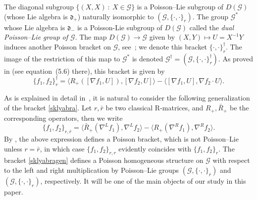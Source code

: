 \documentclass{amsart}
\theoremstyle{definition}
\theoremstyle{remark}
\numberwithin{equation}{section}
\numberwithin{theorem}{section}
\def\D{{\mathfrak d}}
\def\G{{\mathcal G}}
\def\Poi{{\{{\cdot},{\cdot}\}}}
\begin{document}
The diagonal subgroup $\{ (X,X)\ : \ X\in \G\}$ is a Poisson--Lie subgroup of $D(\G)$ (whose Lie algebra is $\D_+$) naturally isomorphic to $(\G,\Poi_r)$.
The group $\G^*$  whose Lie algebra is $\D_-$ is a Poisson-Lie subgroup of $D(\G)$ called the {\em dual Poisson--Lie group of $\G$}.
The map $D(\G) \to \G$ given by $(X,Y) \mapsto U=X^{-1} Y$ induces another Poisson bracket on $\G$, see~\cite{r-sts}; we denote this bracket $\Poi^\dag_r$. 
The image of the restriction of this map to $\G^*$ is denoted 
$\G^\dag=(\G,\Poi^\dag_r)$.
As proved in \cite[Lemma~5.5]{GSVdouble} 
(see equation~(5.6) there), this bracket is given by
\begin{equation}\label{dualbra}
\{f_1,f_2\}^{\dagger}_r =\langle R_+([\nabla f_1,U]),[\nabla f_2,U]\rangle-\langle[\nabla f_1,U],\nabla f_2{\cdot} U\rangle.
\end{equation}


 As is explained in detail in~\cite{GSVple, GSVuni},
 it is natural to consider the following generalization of the 
bracket \eqref{sklyabra}.
Let $r, \bar r$ be two classical R-matrices, and $R_+, \bar R_+$ be the corresponding operators, then we write
\begin{equation}\label{sklyabragen}
\{f_1,f_2\}_{r,\bar r} = \langle \bar R_+(\nabla^L f_1), \nabla^L f_2 \rangle -\langle R_+(\nabla^R f_1), \nabla^R f_2 \rangle.
\end{equation} 
By \cite[Proposition 12.11]{r-sts}, the above expression defines a Poisson bracket, which is not Poisson--Lie unless $r=\bar r$,
in which case $\{f_1,f_2\}_{r,r}$ evidently coincides with $\{f_1,f_2\}_{r}$. 
The bracket \eqref{sklyabragen} defines a Poisson homogeneous structure on $\G$ with respect to the left and right multiplication by Poisson--Lie groups $(\G,\Poi_{\bar r})$ and
$(\G,\Poi_{r})$, respectively. It will be one of the main objects of our study in this paper.
\end{document}
